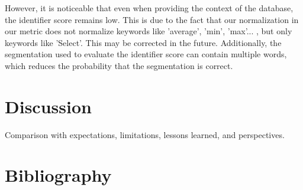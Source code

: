 \documentclass[12pt,a4paper]{article}
\begin{document}
  However, it is noticeable that even when providing the context of the database, the identifier score remains low. This is due to the fact that our normalization in our metric does not normalize keywords like 'average', 'min', 'max'... ,  but only keywords like 'Select'. This may be corrected in the future. Additionally, the segmentation used to evaluate the identifier score can contain multiple words, which reduces the probability that the segmentation is correct. 




\section*{Discussion}

Comparison with expectations, limitations, lessons learned, and perspectives.

\section*{Bibliography}


\end{document}
